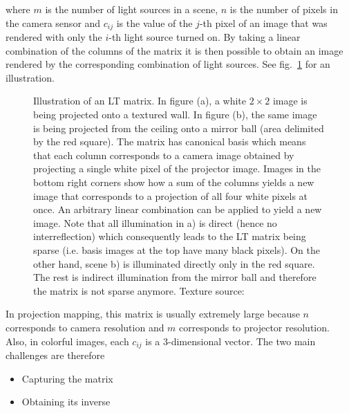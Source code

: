 where \(m\) is the number of light sources in a scene, \(n\) is the number of pixels in the camera sensor and \(c_{ij}\) is the value of the \(j\)-th pixel of an image that was rendered with only the \(i\)-th light source turned on. By taking a linear combination of the columns of the matrix it is then possible to obtain an image rendered by the corresponding combination of light sources. See fig.~\ref{fig:background_lt_capture} for an illustration.

\begin{figure}[]
    \centering
    \begin{subfigure}[b]{\textwidth}
        \centering
        \def\svgwidth{\textwidth}
        
        \caption{}
    \end{subfigure}
    
    \begin{subfigure}[b]{\textwidth}
        \centering
        \def\svgwidth{\textwidth}
        
        \caption{}
    \end{subfigure}
    \caption{Illustration of an LT matrix. In figure (a), a white \(2 \times 2\) image is being projected onto a textured wall. In figure (b), the same image is being projected from the ceiling onto a mirror ball (area delimited by the red square). The matrix has canonical basis which means that each column corresponds to a camera image obtained by projecting a single white pixel of the projector image. Images in the bottom right corners show how a sum of the columns yields a new image that corresponds to a projection of all four white pixels at once. An arbitrary linear combination can be applied to yield a new image. Note that all illumination in a) is direct (hence no interreflection) which consequently leads to the LT matrix being sparse (i.e. basis images at the top have many black pixels). On the other hand, scene b) is illuminated directly only in the red square. The rest is indirect illumination from the mirror ball and therefore the matrix is not sparse anymore. Texture source: \citet{Pixar128}}
    \label{fig:background_lt_capture}
\end{figure}

In projection mapping, this matrix is usually extremely large because \(n\) corresponds to camera resolution and \(m\) corresponds to projector resolution. Also, in colorful images, each \(c_{ij}\) is a 3-dimensional vector. The two main challenges are therefore

\begin{itemize}
    \item Capturing the matrix
    \item Obtaining its inverse
\end{itemize}

